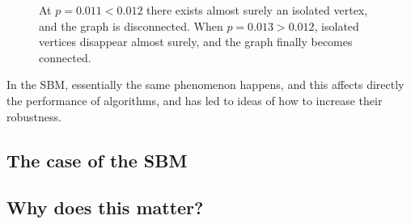\documentclass[../../main.tex]{subfiles} %
\begin{document}
\begin{figure}
	\centering
	\caption{At \(p = 0.011 < 0.012\) there exists almost surely an 
		isolated vertex, and the graph is disconnected. When \(p = 0.013 > 
		0.012\), isolated vertices disappear almost surely, and the graph 
		finally becomes connected.}
	\label{fig:er-connectivity-0}
\end{figure}

In the SBM, essentially the same phenomenon happens, and this affects directly 
the performance of algorithms, and has led to ideas of how to increase their 
robustness.

\subsection{The case of the SBM}

\subsection{Why does this matter?}
\end{document}

